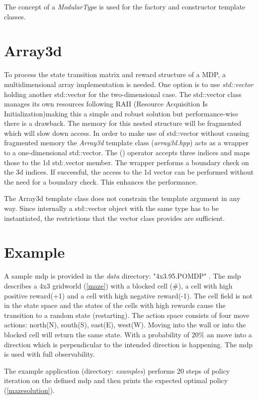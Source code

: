 The concept of a \emph{ModularType} is used for the factory and constructor template classes. 

\section{Array3d}
\label{array}
To process the state transition matrix and reward structure of a MDP, a multidimensional array implementation is needed. One option is to use \emph{std::vector} holding another std::vector for the two-dimensional case. The std::vector class manages its own resources following RAII (Resource Acquisition Is Initialization)making this a simple and robust solution but performance-wise there is a drawback. The memory for this nested structure will be fragmented which will slow down access. 
In order to make use of std::vector without causing fragmented memory the \emph{Array3d} template class (\emph{array3d.hpp}) acts as a wrapper to a one-dimensional std::vector. The () operator accepts three indices and maps those to the 1d std:.vector member. The wrapper performs a boundary check on the 3d indices. If successful, the access to the 1d vector can be performed without the need for a boundary check. This enhances the performance.  

The Array3d template class does not constrain the template argument in any way. Since internally a std::vector object with the same type has to be instantiated, the restrictions that the vector class provides are sufficient. 

\section{Example}

A sample mdp is provided in the \emph{data} directory: "4x3.95.POMDP" \autocite{Cassandra}. The mdp describes a 4x3 gridworld (\autoref{maze}) with a blocked cell (\#), a cell with high positive reward(+1) and a cell with high negative reward(-1). The cell field is not in the state space and the states of the cells with high rewards cause the transition to a random state (restarting). The action space consists of four move actions: north(N), south(S), east(E), west(W). Moving into the wall or into the blocked cell will return the same state. With a probability of 20\% an move into a direction which is perpendicular to the intended direction is happening. The mdp is used with full observability. 

The example application (directory: \emph{examples}) performs 20 steps of policy iteration on the defined mdp and then prints the expected optimal policy (\autoref{mazesolution}).

